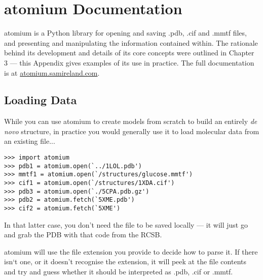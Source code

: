 



\chapter{atomium Documentation} %


atomium is a Python library for opening and saving .pdb, .cif and .mmtf files,
and presenting and manipulating the information contained within. The rationale behind its development and details of its core concepts were outlined in Chapter 3 --- this Appendix gives examples of its use in practice. The full documentation is at \url{atomium.samireland.com}.

\section{Loading Data}

While you can use atomium to create models from scratch to build an entirely \emph{de novo} structure, in practice you would generally use it to load molecular data from an existing file...

\begin{footnotesize}
\begin{verbatim}
>>> import atomium
>>> pdb1 = atomium.open(`../1LOL.pdb')
>>> mmtf1 = atomium.open(`/structures/glucose.mmtf')
>>> cif1 = atomium.open(`/structures/1XDA.cif')
>>> pdb3 = atomium.open(`./5CPA.pdb.gz')
>>> pdb2 = atomium.fetch(`5XME.pdb')
>>> cif2 = atomium.fetch(`5XME')
\end{verbatim}
\end{footnotesize}

In that latter case, you don't need the file to be saved locally --- it will just go and grab the PDB with that code from the RCSB.

atomium will use the file extension you provide to decide how to parse it. If there isn`t one, or it doesn't recognise the extension, it will peek at the file contents and try and guess whether it should be interpreted as .pdb, .cif or .mmtf.

